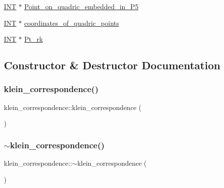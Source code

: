\begin{DoxyCompactItemize}
\item 
\mbox{\hyperlink{galois_8h_a09fddde158a3a20bd2dcadb609de11dc}{I\+NT}} $\ast$ \mbox{\hyperlink{classklein__correspondence_ad5876ee49225708c12b7d396c2c84cb7}{Point\+\_\+on\+\_\+quadric\+\_\+embedded\+\_\+in\+\_\+\+P5}}
\item 
\mbox{\hyperlink{galois_8h_a09fddde158a3a20bd2dcadb609de11dc}{I\+NT}} $\ast$ \mbox{\hyperlink{classklein__correspondence_a9a9350434d1b4300aad803bc8464dc8b}{coordinates\+\_\+of\+\_\+quadric\+\_\+points}}
\item 
\mbox{\hyperlink{galois_8h_a09fddde158a3a20bd2dcadb609de11dc}{I\+NT}} $\ast$ \mbox{\hyperlink{classklein__correspondence_acdbdfeee52911091a16f31c8e24f7ab4}{Pt\+\_\+rk}}
\end{DoxyCompactItemize}


\subsection{Constructor \& Destructor Documentation}
\mbox{\label{classklein__correspondence_adeeae8021b4f43add6f21d6b726bf06b}} 
\subsubsection{\texorpdfstring{klein\+\_\+correspondence()}{klein\_correspondence()}}
{\footnotesize\ttfamily klein\+\_\+correspondence\+::klein\+\_\+correspondence (\begin{DoxyParamCaption}{ }\end{DoxyParamCaption})}

\mbox{\label{classklein__correspondence_ac9ba38c424cdbe34047e5722dd9a5358}} 
\subsubsection{\texorpdfstring{$\sim$klein\+\_\+correspondence()}{~klein\_correspondence()}}
{\footnotesize\ttfamily klein\+\_\+correspondence\+::$\sim$klein\+\_\+correspondence (\begin{DoxyParamCaption}{ }\end{DoxyParamCaption})}



